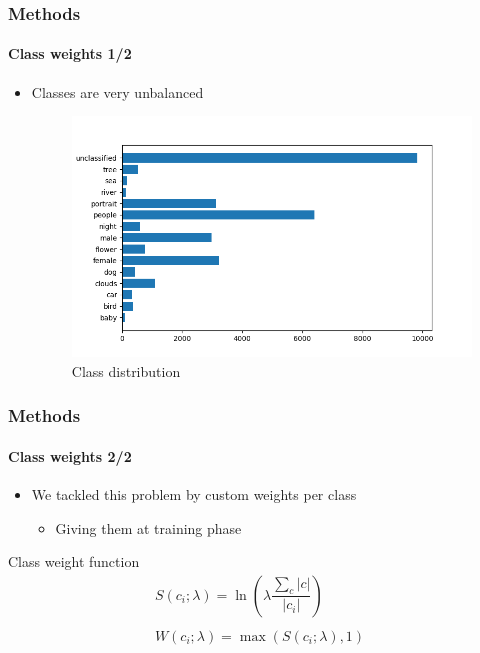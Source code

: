 \begin{frame}
	\frametitle{Methods}
	\framesubtitle{Class weights 1/2}
	\begin{itemize}
		\item Classes are very unbalanced
		\begin{figure}[h]
		\includegraphics[height=0.6\textheight]{images/label_distribution.png}
		\caption{Class distribution}
		\end{figure}
	\end{itemize}
\end{frame}

\begin{frame}
	\frametitle{Methods}
	\framesubtitle{Class weights 2/2}
	\begin{itemize}
			\item We tackled this problem by custom weights per class
			\begin{itemize}
				\item Giving them at training phase
			\end{itemize}
		\end{itemize}
	\begin{block}{Class weight function}
	\begin{align*}
	S(c_i;\lambda) = \ln\left(\lambda \dfrac{\sum_{c}|c|}{|c_i|}\right)\\\\
	W(c_i; \lambda) = \max(S(c_i;\lambda), 1)
	\end{align*}
	\end{block}
\end{frame}

